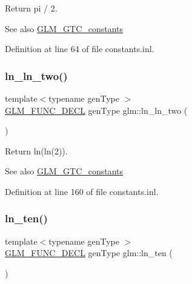 Return pi / 2. \begin{DoxySeeAlso}{See also}
\hyperlink{group__gtc__constants}{G\+L\+M\+\_\+\+G\+T\+C\+\_\+constants} 
\end{DoxySeeAlso}


Definition at line 64 of file constants.\+inl.

\mbox{\label{group__gtc__constants_ga650774609debe4a90bcac449b574de2c}} 
\subsubsection{\texorpdfstring{ln\+\_\+ln\+\_\+two()}{ln\_ln\_two()}}
{\footnotesize\ttfamily template$<$typename gen\+Type $>$ \\
\hyperlink{setup_8hpp_ab2d052de21a70539923e9bcbf6e83a51}{G\+L\+M\+\_\+\+F\+U\+N\+C\+\_\+\+D\+E\+CL} gen\+Type glm\+::ln\+\_\+ln\+\_\+two (\begin{DoxyParamCaption}{ }\end{DoxyParamCaption})}

Return ln(ln(2)). \begin{DoxySeeAlso}{See also}
\hyperlink{group__gtc__constants}{G\+L\+M\+\_\+\+G\+T\+C\+\_\+constants} 
\end{DoxySeeAlso}


Definition at line 160 of file constants.\+inl.

\mbox{\label{group__gtc__constants_ga48addf0cb0980277d208a71a1c59c073}} 
\subsubsection{\texorpdfstring{ln\+\_\+ten()}{ln\_ten()}}
{\footnotesize\ttfamily template$<$typename gen\+Type $>$ \\
\hyperlink{setup_8hpp_ab2d052de21a70539923e9bcbf6e83a51}{G\+L\+M\+\_\+\+F\+U\+N\+C\+\_\+\+D\+E\+CL} gen\+Type glm\+::ln\+\_\+ten (\begin{DoxyParamCaption}{ }\end{DoxyParamCaption})}

